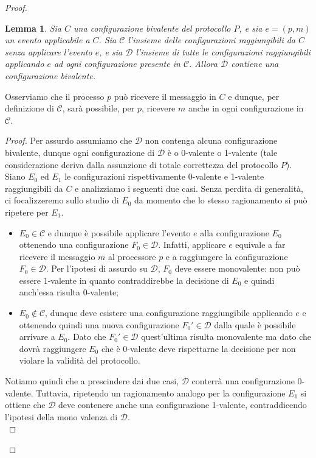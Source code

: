 \documentclass{article}
\newtheorem{lemma}{Lemma}
\begin{document}
\begin{proof}
 \begin{lemma}
Sia $C$ una configurazione bivalente del protocollo $P$, e sia $e=(p,m)$ un evento applicabile a $C$. Sia $\mathcal{C}$ l'insieme delle configurazioni raggiungibili da $C$ senza applicare l'evento $e$, e sia $\mathcal{D}$ l'insieme di tutte le configurazioni raggiungibili applicando $e$ ad ogni configurazione presente in $\mathcal{C}$. Allora $\mathcal{D}$ contiene una configurazione bivalente. 
\end{lemma}
Osserviamo che il processo $p$ può ricevere il messaggio in $C$ e dunque, per definizione di $\mathcal{C}$, sarà possibile, per $p$, ricevere $m$ anche in ogni configurazione in $\mathcal{C}$.
\begin{proof}
Per assurdo assumiamo che $\mathcal{D}$ non contenga alcuna configurazione bivalente, dunque ogni configurazione di $\mathcal{D}$ è o 0-valente o 1-valente (tale considerazione deriva dalla assunzione di totale correttezza del protocollo $P$). Siano $E_0$ ed $E_1$ le configurazioni rispettivamente 0-valente e 1-valente raggiungibili da $C$ e analizziamo i seguenti due casi. Senza perdita di generalità, ci focalizzeremo sullo studio di $E_0$ da momento che lo stesso ragionamento si può ripetere per $E_1$.
\begin{itemize}
\item $E_0 \in \mathcal{C}$ e dunque è possibile applicare l'evento $e$ alla configurazione $E_0$ ottenendo una configurazione $F_0 \in \mathcal{D}$. Infatti, applicare $e$ equivale a far ricevere il messaggio $m$ al processore $p$ e a raggiungere la configurazione $F_0 \in \mathcal{D}$. Per l'ipotesi di assurdo su $\mathcal{D}$, $F_0$ deve essere monovalente: non può essere 1-valente in quanto contraddirebbe la decisione di $E_0$ e quindi anch'essa risulta 0-valente;
\item  $E_0 \not \in \mathcal{C}$, dunque deve esistere una configurazione raggiungibile applicando $e$ e ottenendo quindi una nuova configurazione $F_0' \in \mathcal{D}$ dalla quale è possibile arrivare a $E_0$. Dato che $F_0' \in \mathcal{D}$ quest'ultima risulta monovalente ma dato che dovrà raggiungere $E_0$ che è 0-valente deve rispettarne la decisione per non violare la validità del protocollo.    
\end{itemize}
Notiamo quindi che a prescindere dai due casi, $\mathcal{D}$ conterrà una configurazione 0-valente. Tuttavia, ripetendo un ragionamento analogo per la configurazione $E_1$ si ottiene che $\mathcal{D}$ deve contenere anche una configurazione 1-valente, contraddicendo l'ipotesi della mono valenza di $\mathcal{D}$. \\

\end{proof}
\end{proof}
\end{document}
